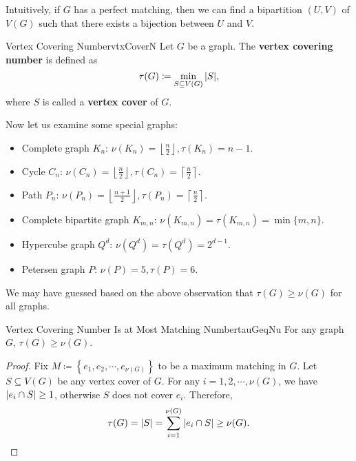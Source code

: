 \documentclass[math, code]{amznotes}
\theoremstyle{remark}
\begin{document}
Intuitively, if $G$ has a perfect matching, then we can find a bipartition $(U, V)$ of $V(G)$ such that there exists a bijection between $U$ and $V$.
\begin{dfnbox}{Vertex Covering Number}{vtxCoverN}
    Let $G$ be a graph. The {\color{red} \textbf{vertex covering number}} is defined as 
    \begin{equation*}
        \tau(G) \coloneqq \min_{S \subseteq V(G)}{\left\lvert {S} \right\rvert},
    \end{equation*}
    where $S$ is called a {\color{red} \textbf{vertex cover}} of $G$.    
\end{dfnbox}
Now let us examine some special graphs:
\begin{itemize}
    \item Complete graph $K_n$: $\nu(K_n) = \left\lfloor\frac{n}{2}\right\rfloor, \tau(K_n) = n - 1$.
    \item Cycle $C_n$: $\nu(C_n) = \left\lfloor\frac{n}{2}\right\rfloor, \tau(C_n) = \left\lceil\frac{n}{2}\right\rceil$.
    \item Path $P_n$: $\nu(P_n) = \left\lfloor\frac{n + 1}{2}\right\rfloor, \tau(P_n) = \left\lceil\frac{n}{2}\right\rceil$.
    \item Complete bipartite graph $K_{m, n}$: $\nu(K_{m, n}) = \tau(K_{m, n}) = \min\{m, n\}$.
    \item Hypercube graph $Q^d$: $\nu(Q^d) = \tau(Q^d) = 2^{d - 1}$.
    \item Petersen graph $P$: $\nu(P) = 5, \tau(P) = 6$.
\end{itemize}
We may have guessed based on the above observation that $\tau(G) \geq \nu(G)$ for all graphs.
\begin{probox}{Vertex Covering Number Is at Most Matching Number}{tauGeqNu}
    For any graph $G$, $\tau(G) \geq \nu(G)$.
    \tcblower
    \begin{proof}
        Fix $M \coloneqq \left\{e_1, e_2, \cdots, e_{\nu(G)}\right\}$ to be a maximum matching in $G$. Let $S \subseteq V(G)$ be any vertex cover of $G$. For any $i = 1, 2, \cdots, \nu(G)$, we have ${\left\lvert {e_i \cap S} \right\rvert} \geq 1$, otherwise $S$ does not cover $e_i$. Therefore,
        \begin{equation*}
            \tau(G) = {\left\lvert {S} \right\rvert} = \sum_{i = 1}^{\nu(G)}{\left\lvert {e_i \cap S} \right\rvert} \geq \nu(G).
        \end{equation*}
    \end{proof}
\end{probox}
\end{document}
